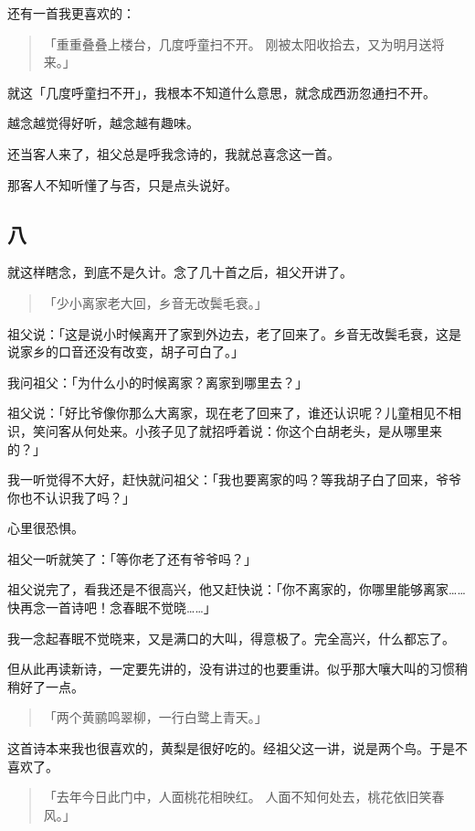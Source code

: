 \documentclass[UTF8]{ctexart}
\begin{document}
还有一首我更喜欢的：

\begin{verse}
    「重重叠叠上楼台，几度呼童扫不开。
    刚被太阳收拾去，又为明月送将来。」
\end{verse}

就这「几度呼童扫不开」，我根本不知道什么意思，就念成西沥忽通扫不开。

越念越觉得好听，越念越有趣味。

还当客人来了，祖父总是呼我念诗的，我就总喜念这一首。

那客人不知听懂了与否，只是点头说好。

\subsection{八}

就这样瞎念，到底不是久计。念了几十首之后，祖父开讲了。

\begin{verse}
    「少小离家老大回，乡音无改鬓毛衰。」
\end{verse}

祖父说：「这是说小时候离开了家到外边去，老了回来了。乡音无改鬓毛衰，这是说家乡的口音还没有改变，胡子可白了。」

我问祖父：「为什么小的时候离家？离家到哪里去？」

祖父说：「好比爷像你那么大离家，现在老了回来了，谁还认识呢？儿童相见不相识，笑问客从何处来。小孩子见了就招呼着说：你这个白胡老头，是从哪里来的？」

我一听觉得不大好，赶快就问祖父：「我也要离家的吗？等我胡子白了回来，爷爷你也不认识我了吗？」

心里很恐惧。

祖父一听就笑了：「等你老了还有爷爷吗？」

祖父说完了，看我还是不很高兴，他又赶快说：「你不离家的，你哪里能够离家……快再念一首诗吧！念春眠不觉晓……」

我一念起春眠不觉晓来，又是满口的大叫，得意极了。完全高兴，什么都忘了。

但从此再读新诗，一定要先讲的，没有讲过的也要重讲。似乎那大嚷大叫的习惯稍稍好了一点。

\begin{verse}
    「两个黄鹂鸣翠柳，一行白鹭上青天。」
\end{verse}

这首诗本来我也很喜欢的，黄梨是很好吃的。经祖父这一讲，说是两个鸟。于是不喜欢了。

\begin{verse}
    「去年今日此门中，人面桃花相映红。
    人面不知何处去，桃花依旧笑春风。」
\end{verse}
\end{document}
